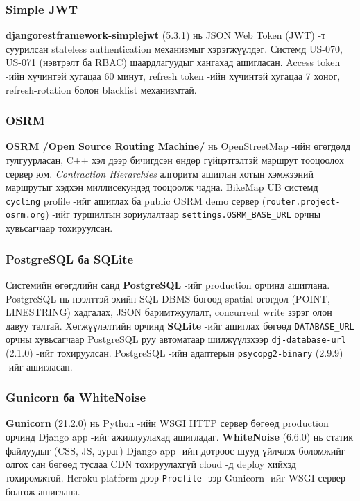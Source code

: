 \subsubsection{Simple JWT}
\textbf{djangorestframework-simplejwt} (5.3.1) нь JSON Web Token (JWT) -т суурилсан stateless authentication механизмыг хэрэгжүүлдэг. Системд US-070, US-071 (нэвтрэлт ба RBAC) шаардлагуудыг хангахад ашигласан. Access token -ийн хүчинтэй хугацаа 60 минут, refresh token -ийн хүчинтэй хугацаа 7 хоног, refresh-rotation болон blacklist механизмтай.

\subsubsection{OSRM}
\textbf{OSRM /Open Source Routing Machine/} нь OpenStreetMap -ийн өгөгдөлд тулгуурласан, C++ хэл дээр бичигдсэн өндөр гүйцэтгэлтэй маршрут тооцоолох сервер юм. \textit{Contraction Hierarchies} алгоритм ашиглан хотын хэмжээний маршрутыг хэдхэн миллисекундэд тооцоолж чадна. BikeMap UB системд \texttt{cycling} profile -ийг ашиглах ба public OSRM demo сервер (\texttt{router.project-osrm.org}) -ийг туршилтын зориулалтаар \texttt{settings.OSRM\_BASE\_URL} орчны хувьсагчаар тохируулсан.

\subsubsection{PostgreSQL ба SQLite}
Системийн өгөгдлийн санд \textbf{PostgreSQL} -ийг production орчинд ашиглана. PostgreSQL нь нээлттэй эхийн SQL DBMS бөгөөд spatial өгөгдөл (POINT, LINESTRING) хадгалах, JSON баримтжуулалт, concurrent write зэрэг олон давуу талтай. Хөгжүүлэлтийн орчинд \textbf{SQLite} -ийг ашиглах бөгөөд \texttt{DATABASE\_URL} орчны хувьсагчаар PostgreSQL руу автоматаар шилжүүлэхээр \texttt{dj-database-url} (2.1.0) -ийг тохируулсан. PostgreSQL -ийн адаптерын \texttt{psycopg2-binary} (2.9.9) -ийг ашигласан.

\subsubsection{Gunicorn ба WhiteNoise}
\textbf{Gunicorn} (21.2.0) нь Python -ийн WSGI HTTP сервер бөгөөд production орчинд Django app -ийг ажиллуулахад ашигладаг. \textbf{WhiteNoise} (6.6.0) нь статик файлуудыг (CSS, JS, зураг) Django app -ийн дотроос шууд үйлчлэх боломжийг олгох сан бөгөөд тусдаа CDN тохируулахгүй cloud -д deploy хийхэд тохиромжтой. Heroku platform дээр \texttt{Procfile} -ээр Gunicorn -ийг WSGI сервер болгож ашиглана.

